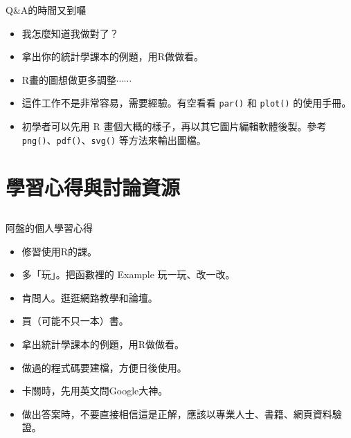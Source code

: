 \documentclass[14pt, aspectratio=43]{beamer}
\begin{document}


\begin{frame}[fragile]{Q\&A的時間又到囉}
\begin{itemize}
\item[Q] 我怎麼知道我做對了？
\item[A] 拿出你的統計學課本的例題，用R做做看。
\end{itemize}
\begin{itemize}\item[Q] R畫的圖想做更多調整$\cdots\cdots$
\item[A1] 這件工作不是非常容易，需要經驗。有空看看 \verb+par()+ 和 \verb+plot()+ 的使用手冊。
\item[A2] 初學者可以先用 R 畫個大概的樣子，再以其它圖片編輯軟體後製。參考 \verb+png()+、\verb+pdf()+、\verb+svg()+ 等方法來輸出圖檔。
\end{itemize}
\end{frame}



\section{學習心得與討論資源}\subsection{}

\begin{frame}{阿盤的個人學習心得}
\begin{itemize}
\item 修習使用R的課。
\item 多「玩」。把函數裡的 Example 玩一玩、改一改。
\item 肯問人。逛逛網路教學和論壇。
\item 買（可能不只一本）書。
\item 拿出統計學課本的例題，用R做做看。
\item 做過的程式碼要建檔，方便日後使用。
\item 卡關時，先用英文問Google大神。
\item 做出答案時，不要直接相信這是正解，應該以專業人士、書籍、網頁資料驗證。
\end{itemize}
\end{frame}
\end{document}
